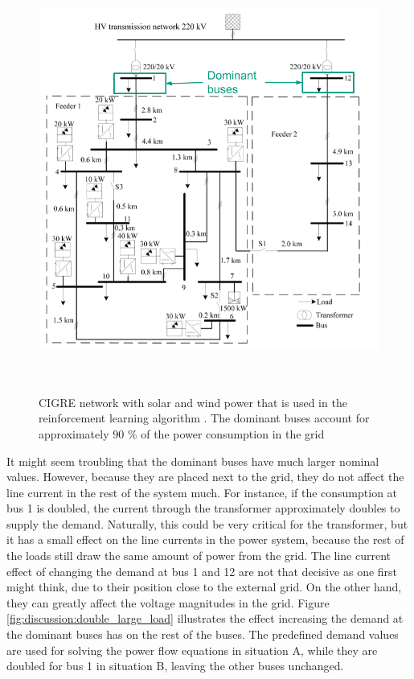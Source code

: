 \documentclass[class=book, crop=false, 11pt]{standalone}
\begin{document}
\begin{figure}[ht!]
    \center
    \includegraphics[height=14cm, width=13.5cm]{figures/cigre_network_dominant.png}
    \caption {CIGRE network with solar and wind power that is used in the reinforcement learning algorithm \cite{cigre}. The dominant buses account for approximately 90 \% of the power consumption in the grid}
    \label{fig:discussion:cigre_network_dominant}
\end{figure}
It might seem troubling that the dominant buses have much larger nominal values. However, because they are placed next to the grid, they do not affect the line current in the rest of the system much. For instance, if the consumption at bus 1 is doubled, the current through the transformer approximately doubles to supply the demand. Naturally, this could be very critical for the transformer, but it has a small effect on the line currents in the power system, because the rest of the loads still draw the same amount of power from the grid. The line current effect of changing the demand at bus 1 and 12 are not that decisive as one first might think, due to their position close to the external grid. On the other hand, they can greatly affect the voltage magnitudes in the grid. Figure \ref{fig:discussion:double_large_load} illustrates the effect increasing the demand at the dominant buses has on the rest of the buses. The predefined demand values are used for solving the power flow equations in situation A, while they are doubled for bus 1 in situation B, leaving the other buses unchanged.
\end{document}
